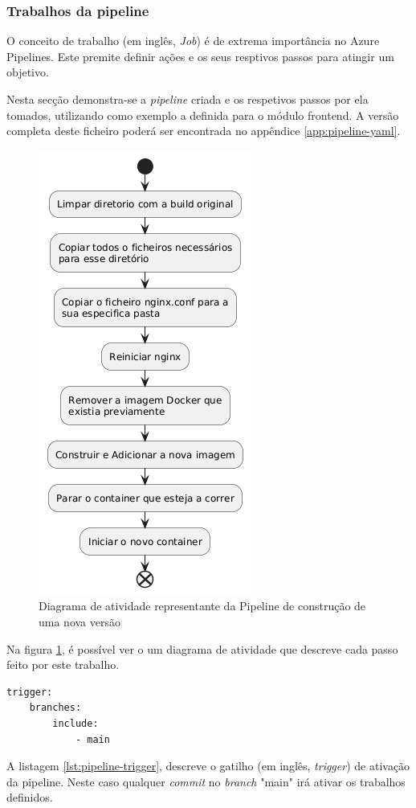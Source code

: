 \subsubsection{Trabalhos da pipeline}

O conceito de trabalho (em inglês, \textit{Job}) é de extrema importância no Azure Pipelines. Este premite definir ações e os seus resptivos passos para atingir um objetivo.

Nesta secção demonstra-se a \textit{pipeline} criada e os respetivos passos por ela tomados, utilizando como exemplo a definida para o módulo frontend. A versão completa deste ficheiro poderá ser encontrada no appêndice \ref{app:pipeline-yaml}. 

\begin{figure}
    \centering
    \includegraphics[width=0.3\linewidth]{capitulos/cap4-implementacao/assets/pipeline-activity-diagram.png}
    \caption{Diagrama de atividade representante da Pipeline de construção de uma nova versão}
    \label{fig:pipeline-ad}
\end{figure}


Na figura \ref{fig:pipeline-ad}, é possível ver o um diagrama de atividade que descreve cada passo feito por este trabalho.

\begin{lstlisting}[caption={Trigger - Pipeline},label={lst:pipeline-trigger}]
trigger:
    branches:
        include:
            - main
\end{lstlisting}


A listagem \ref{lst:pipeline-trigger}, descreve o gatilho (em inglês, \textit{trigger}) de ativação da pipeline. Neste caso qualquer \textit{commit} no \textit{branch} "main" irá ativar os trabalhos definidos.


